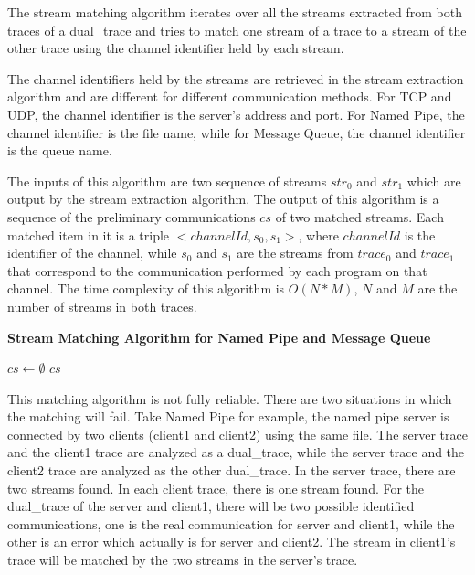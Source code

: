 \documentclass[12pt,oneside]{book}
\begin{document}
The stream matching algorithm iterates over all the streams extracted from both traces of a dual\_trace and tries to match one stream of a trace to a stream of the other trace using the channel identifier held by each stream.

The channel identifiers held by the streams are retrieved in the stream extraction algorithm and are different for different communication methods. For TCP and UDP, the channel identifier is the server's address and port. For Named Pipe, the channel identifier is the file name, while for Message Queue, the channel identifier is the queue name.  

 The inputs of this algorithm are two sequence of streams $str_0$ and $str_1$ which are output by the stream extraction algorithm. The output of this algorithm is a sequence of the preliminary communications $cs$ of two matched streams. Each matched item in it is a triple $<channelId, s_0, s_1>$, where $channelId$ is the identifier of the channel, while $s_0$ and $s_1$ are the streams from $trace_0$ and $trace_1$ that correspond to the communication performed by each program on that channel. The time complexity of this algorithm is $O(N*M)$, $N$ and $M$ are the number of streams in both traces.

 \begin{algorithm}[H]
\DontPrintSemicolon
\caption{{\bf Stream Matching Algorithm for Named Pipe and Message Queue} \label{matchAlg}}
$cs \leftarrow \emptyset$\; 
\KwRet $cs$\;
\end{algorithm} 

This matching algorithm is not fully reliable. There are two situations in which the matching will fail. Take Named Pipe for example, the named pipe server is connected by two clients (client1 and client2) using the same file. The server trace and the client1 trace are analyzed as a dual\_trace, while the server trace and the client2 trace are analyzed as the other dual\_trace. In the server trace, there are two streams found. In each client trace, there is one stream found. For the dual\_trace of the server and client1, there will be two possible identified communications, one is the real communication for server and client1, while the other is an error which actually is for server and client2. The stream in client1's trace will be matched by the two streams in the server's trace. 
\end{document}

